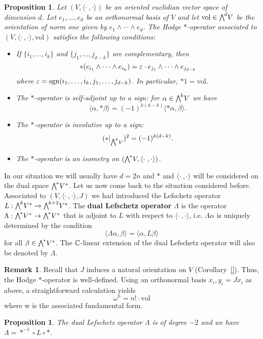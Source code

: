 \documentclass[11pt]{book}
\newtheorem{proposition}[theorem]{Proposition}
\theoremstyle{definition}
\newtheorem{remark}{Remark}[section]
\begin{document}
\begin{proposition}\label{almost complex space Hodge star operator prop}
Let $(V,\langle\cdot\ ,\cdot\rangle)$ be an oriented euclidian vector space of dimension $d$. Let $e_1,\dots,e_d$ be an orthonormal basis of $V$ and let $\mathrm{vol}\in\bigw^dV$ be the orientation of norm one given by $e_1\wedge\cdots\wedge e_d$. The Hodge $\ast$-operator associated to $(V,\langle\cdot\ ,\cdot\rangle,\mathrm{vol})$ satisfies the following conditions:
\begin{itemize}
\item[(a)] If $\{i_1,\dots,i_k\}$ and $\{j_1,\dots,j_{d-k}\}$ are complementary, then
\[\ast(e_{i_1}\wedge\cdots\wedge e_{i_k})=\varepsilon\cdot e_{j_1}\wedge\cdots\wedge e_{j_{d-k}}\]
where $\varepsilon=\mathrm{sgn}(i_1,\dots,i_k,j_1,\dots,j_{d-k})$. In particular, $\ast 1=\mathrm{vol}$. 
\item[(b)] The $\ast$-operator is self-adjoint up to a sign: for $\alpha\in\bigw^kV$ we have
\[\langle\alpha,\ast\beta\rangle=(-1)^{k(d-k)}\langle\ast\alpha,\beta\rangle.\] 
\item[(c)] The $\ast$-operator is involutive up to a sign:
\[(\ast|_{\bigw^kV})^2=(-1)^{k(d-k)}.\] 
\item[(d)] The $\ast$-operator is an isometry on $(\bigw^*V,\langle\cdot\ ,\cdot\rangle)$.
\end{itemize}
\end{proposition}
In our situation we will usually have $d=2n$ and $\ast$ and $\langle\cdot\ ,\cdot\rangle$ will be considered on the dual space $\bigw^*V^*$. Let us now come back to the situation considered before. Associated to $(V,\langle\cdot\ ,\cdot\rangle,J)$ we had introduced the Lefschetz operator $L:\bigw^kV^*\to\bigw^{k+2}V^*$. The \textbf{dual Lefschetz operator} $\Lambda$ is the operator $\Lambda:\bigw^*V^*\to\bigw^*V^*$ that is adjoint to $L$ with respect to $\langle\cdot\ ,\cdot\rangle$, i.e. $\Lambda\alpha$ is uniquely determined by the condition
\[\langle\Lambda\alpha,\beta\rangle=\langle\alpha,L\beta\rangle\]
for all $\beta\in\bigw^*V^*$. The $\mathbb{C}$-linear extension of the dual Lefschetz operator will also be denoted by $\Lambda$.
\begin{remark}
Recall that $J$ induces a natural orientation on $V$ (Corollary~\ref{}). Thus, the Hodge $\ast$-operator is well-defined. Using an orthonormal basis $x_i,y_i=Jx_i$ as above, a straightforward calculation yields
\[\omega^n=n!\cdot\mathrm{vol}\]
where w is the associated fundamental form.
\end{remark}
\begin{proposition}\label{almost complex space Lefschetz dual operator expression}
The dual Lefschetz operator $\Lambda$ is of degree $-2$ and we have $\Lambda=\ast^{-1}\circ L\circ\ast$.
\end{proposition}
\end{document}

